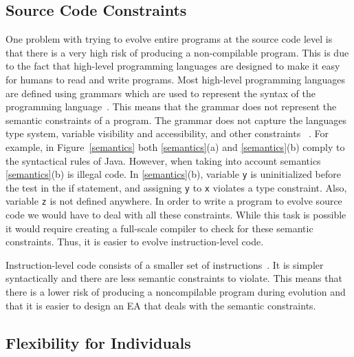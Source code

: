\documentclass{sig-alternate}
\begin{document}
\subsection{Source Code Constraints}
One problem with trying to evolve entire programs at the source code level is that there is a very high risk of producing a non-compilable program. This is due to the fact that high-level programming languages are designed to make it easy for humans to read and write programs. Most high-level programming languages are defined using grammars which are used to represent the syntax of the programming language~\cite{Oracle:2013,Assembly:2010}. This means that the grammar does not represent the semantic constraints of a program. The grammar does not capture the languages type system, variable visibility and accessibility, and other constraints ~\cite{FINCH:2011}. For example, in Figure~\ref{semantics} both \ref{semantics}(a) and \ref{semantics}(b) comply to the syntactical rules of Java. However, when taking into account semantics \ref{semantics}(b) is illegal code. In \ref{semantics}(b), variable \texttt{y} is uninitialized before the test in the if statement, and assigning \texttt{y} to \texttt{x} violates a type constraint. Also, variable \texttt{z} is not defined anywhere.  In order to write a program to evolve source code we would have to deal with all these constraints. While this task is possible it would require creating a full-scale compiler to check for these semantic constraints. Thus, it is easier to evolve instruction-level code. \par

Instruction-level code consists of a smaller set of instructions~\cite{Assembly:2010}. It is simpler syntactically and there are less semantic constraints to violate. This means that there is a lower risk of producing a noncompilable program during evolution and that it is easier to design an EA that deals with the semantic constraints.

\subsection{Flexibility  for Individuals}
\end{document}
